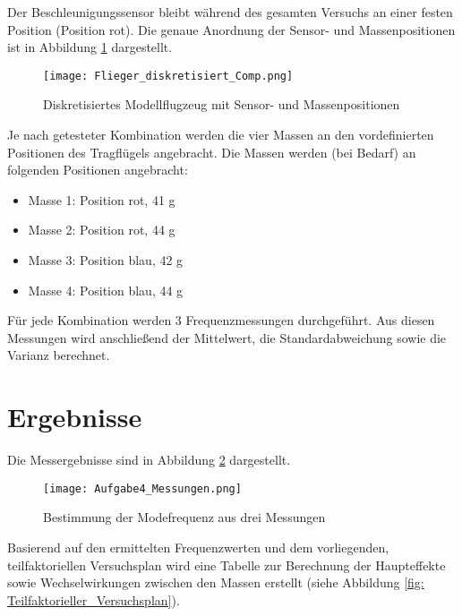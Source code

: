    \noindent
    Der Beschleunigungssensor bleibt während des gesamten Versuchs an einer festen Position 
    (Position  rot\grqq). Die genaue Anordnung der Sensor- und Massenpositionen ist in 
    Abbildung \ref{fig: Flieger_diskretisiert_2} dargestellt.

    \begin{figure}[H]
        \centering
        \texttt{[image: Flieger\_diskretisiert\_Comp.png]}
        \caption{Diskretisiertes Modellflugzeug mit Sensor- und Massenpositionen}
        \label{fig: Flieger_diskretisiert_2}
    \end{figure}

    \noindent
    Je nach getesteter Kombination werden die vier Massen an den vordefinierten
    Positionen des Tragflügels angebracht. Die Massen werden (bei Bedarf) an
    folgenden Positionen angebracht:

    \begin{itemize}
        \item Masse 1: Position  rot\grqq, 41 g  
        \item Masse 2: Position  rot\grqq, 44 g  
        \item Masse 3: Position  blau\grqq, 42 g  
        \item Masse 4: Position  blau\grqq, 44 g  
    \end{itemize}

    \noindent
    Für jede Kombination werden 3 Frequenzmessungen durchgeführt. Aus diesen
    Messungen wird anschließend der Mittelwert, die Standardabweichung sowie
    die Varianz berechnet.
    \newpage
\section{Ergebnisse}
    Die Messergebnisse sind in Abbildung \ref{fig: Aufgabe4_Messungen} dargestellt.
    
    \begin{figure}[H]
        \centering
        \texttt{[image: Aufgabe4\_Messungen.png]}
        \caption{Bestimmung der Modefrequenz aus drei Messungen}
        \label{fig: Aufgabe4_Messungen}
    \end{figure}
    
    \noindent
    Basierend auf den ermittelten Frequenzwerten und dem vorliegenden,
    teilfaktoriellen Versuchsplan wird eine Tabelle zur Berechnung der
    Haupteffekte sowie Wechselwirkungen zwischen den Massen erstellt
    (siehe Abbildung \ref{fig: Teilfaktorieller_Versuchsplan}).
    
